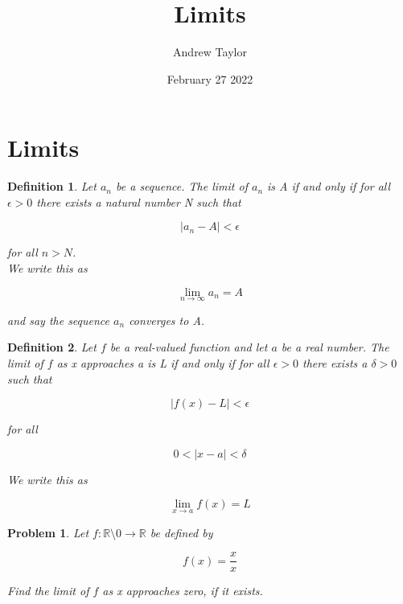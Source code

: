 \documentclass{article}
\title{Limits}
\author{Andrew Taylor}
\date{February 27 2022}
\newtheorem{definition}{Definition}
\newtheorem{problem}{Problem}
\begin{document}
\maketitle
\section{Limits}

\begin{definition}
Let $a_{n}$ be a sequence. The limit of $a_{n}$ is A if and only if for all $\epsilon > 0$ there exists a natural number N such that 

\begin{equation*}
|a_{n} - A| < \epsilon
\end{equation*}

for all $n > N$. \\

We write this as 

\begin{equation*}
\lim_{n \to \infty} a_{n} = A
\end{equation*}

and say the sequence $a_{n}$ converges to A.

\end{definition}

\begin{definition}
Let $f$ be a real-valued function and let $a$ be a real number. The limit of $f$ as x approaches a is L if and only if for all $\epsilon > 0$ there exists a $\delta > 0$ such that

\begin{equation*}
|f(x) - L| < \epsilon
\end{equation*}

for all 

\begin{equation*}
0 < |x - a| < \delta
\end{equation*}

We write this as 

\begin{equation*}
\lim_{x \to a} f(x) = L
\end{equation*}

\end{definition}

\begin{problem}
Let $f:\mathbb{R} \setminus {0} \to \mathbb{R}$ be defined by 

\begin{equation*}
f(x) = \frac{x}{x}
\end{equation*}

Find the limit of $f$ as x approaches zero, if it exists.
\end{problem}
\end{document}

